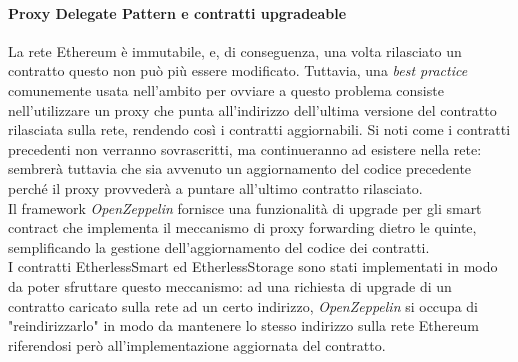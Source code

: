   \paragraph{Proxy Delegate Pattern e contratti upgradeable}
    La rete Ethereum è immutabile, e, di conseguenza, una volta rilasciato un contratto questo non può più essere modificato. Tuttavia, una \textit{best practice} comunemente usata nell'ambito per ovviare a questo problema consiste nell'utilizzare un proxy che punta all'indirizzo dell'ultima versione del contratto rilasciata sulla rete, rendendo così i contratti aggiornabili. Si noti come i contratti precedenti non verranno sovrascritti, ma continueranno ad esistere nella rete: sembrerà tuttavia che sia avvenuto un aggiornamento del codice precedente perché il proxy provvederà a puntare all'ultimo contratto rilasciato. \\
    Il framework \textit{OpenZeppelin} fornisce una funzionalità di upgrade per gli smart contract che implementa il meccanismo di proxy forwarding dietro le quinte, semplificando la gestione dell'aggiornamento del codice dei contratti. \\
    I contratti EtherlessSmart ed EtherlessStorage sono stati implementati in modo da poter sfruttare questo meccanismo: ad una richiesta di upgrade di un contratto caricato sulla rete ad un certo indirizzo, \textit{OpenZeppelin} si occupa di "reindirizzarlo" in modo da mantenere lo stesso indirizzo sulla rete Ethereum riferendosi però all'implementazione aggiornata del contratto.

